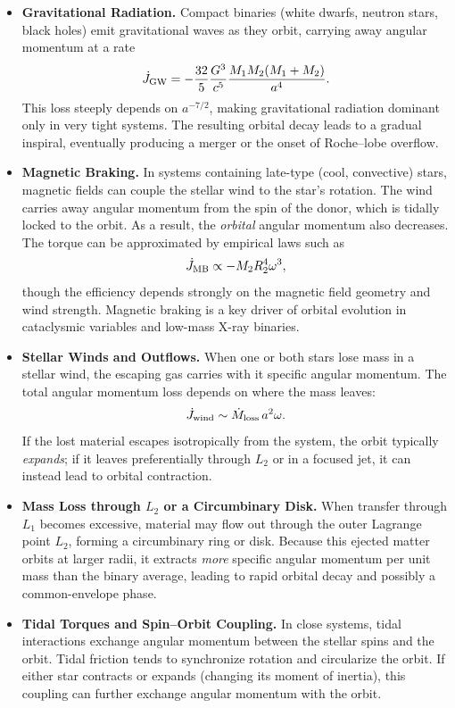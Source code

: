 \begin{itemize}
    \item \textbf{Gravitational Radiation.}  
    Compact binaries (white dwarfs, neutron stars, black holes) emit gravitational waves as they orbit, carrying away angular momentum at a rate
    \[
    \dot{J}_{\rm GW} = -\frac{32}{5}\frac{G^{3}}{c^5}
        \frac{M_1M_2(M_1 + M_2)}{a^{4}}.
    \]
    This loss steeply depends on $a^{-7/2}$, making gravitational radiation dominant only in very tight systems.  
    The resulting orbital decay leads to a gradual inspiral, eventually producing a merger or the onset of Roche–lobe overflow.

    \item \textbf{Magnetic Braking.}  
    In systems containing late-type (cool, convective) stars, magnetic fields can couple the stellar wind to the star’s rotation.  
    The wind carries away angular momentum from the spin of the donor, which is tidally locked to the orbit.  
    As a result, the \emph{orbital} angular momentum also decreases.  
    The torque can be approximated by empirical laws such as
    \[
    \dot{J}_{\rm MB} \propto - M_2 R_2^{4} \omega^{3},
    \]
    though the efficiency depends strongly on the magnetic field geometry and wind strength.  
    Magnetic braking is a key driver of orbital evolution in cataclysmic variables and low-mass X-ray binaries.

    \item \textbf{Stellar Winds and Outflows.}  
    When one or both stars lose mass in a stellar wind, the escaping gas carries with it specific angular momentum.  
    The total angular momentum loss depends on where the mass leaves:
    \[
    \dot{J}_{\rm wind} \sim \dot{M}_{\rm loss}\, a^2 \omega.
    \]
    If the lost material escapes isotropically from the system, the orbit typically \emph{expands}; if it leaves preferentially through $L_2$ or in a focused jet, it can instead lead to orbital contraction.

    \item \textbf{Mass Loss through $L_2$ or a Circumbinary Disk.}  
    When transfer through $L_1$ becomes excessive, material may flow out through the outer Lagrange point $L_2$, forming a circumbinary ring or disk.  
    Because this ejected matter orbits at larger radii, it extracts \emph{more} specific angular momentum per unit mass than the binary average, leading to rapid orbital decay and possibly a common-envelope phase.

    \item \textbf{Tidal Torques and Spin–Orbit Coupling.}  
    In close systems, tidal interactions exchange angular momentum between the stellar spins and the orbit.  
    Tidal friction tends to synchronize rotation and circularize the orbit.  
    If either star contracts or expands (changing its moment of inertia), this coupling can further exchange angular momentum with the orbit.
\end{itemize}


